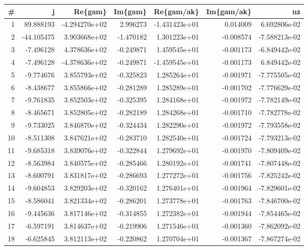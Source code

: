 \begin{tabular}{rrrrrrr}
\toprule
   \# &          j &       Re\{gam\} &   Im\{gam\} &    Re\{gam/ak\} &  Im\{gam/ak\} &            nz \\
\midrule
   1 &  89.888193 & -4.294270e+02 &  2.996273 & -1.431423e+01 &    0.014009 &  6.692806e-02 \\
   2 & -44.105475 &  3.903668e+02 & -1.470182 &  1.301223e+01 &   -0.008574 & -7.588213e-02 \\
   3 &  -7.496128 &  4.378636e+02 & -0.249871 &  1.459545e+01 &   -0.001173 & -6.849442e-02 \\
   4 &  -7.496128 & -4.378636e+02 & -0.249871 & -1.459545e+01 &   -0.001173 &  6.849442e-02 \\
   5 &  -9.774676 &  3.855793e+02 & -0.325823 &  1.285264e+01 &   -0.001971 & -7.775505e-02 \\
   6 &  -8.438677 &  3.855866e+02 & -0.281289 &  1.285289e+01 &   -0.001702 & -7.776629e-02 \\
   7 &  -9.761835 &  3.852503e+02 & -0.325395 &  1.284168e+01 &   -0.001972 & -7.782149e-02 \\
   8 &  -8.465671 &  3.852805e+02 & -0.282189 &  1.284268e+01 &   -0.001710 & -7.782778e-02 \\
   9 &  -9.733025 &  3.846870e+02 & -0.324434 &  1.282290e+01 &   -0.001972 & -7.793558e-02 \\
  10 &  -8.511308 &  3.847621e+02 & -0.283710 &  1.282540e+01 &   -0.001724 & -7.793213e-02 \\
  11 &  -9.685318 &  3.839076e+02 & -0.322844 &  1.279692e+01 &   -0.001970 & -7.809409e-02 \\
  12 &  -8.563984 &  3.840575e+02 & -0.285466 &  1.280192e+01 &   -0.001741 & -7.807448e-02 \\
  13 &  -8.600791 &  3.831817e+02 & -0.286693 &  1.277272e+01 &   -0.001756 & -7.825242e-02 \\
  14 &  -9.604853 &  3.829203e+02 & -0.320162 &  1.276401e+01 &   -0.001964 & -7.829601e-02 \\
  15 &  -8.586041 &  3.821334e+02 & -0.286201 &  1.273778e+01 &   -0.001763 & -7.846700e-02 \\
  16 &  -9.445636 &  3.817146e+02 & -0.314855 &  1.272382e+01 &   -0.001944 & -7.854465e-02 \\
  17 &  -6.597191 &  3.814637e+02 & -0.219906 &  1.271546e+01 &   -0.001360 & -7.862092e-02 \\
  18 &  -6.625845 &  3.812113e+02 & -0.220862 &  1.270704e+01 &   -0.001367 & -7.867274e-02 \\

\end{tabular}
